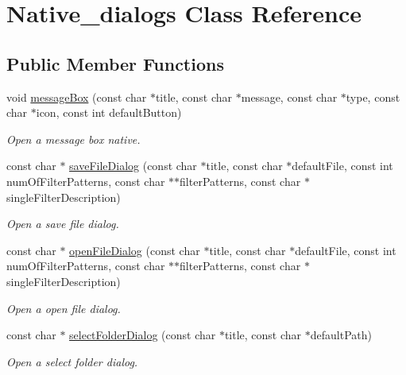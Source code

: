 \hypertarget{class_native__dialogs}{}\section{Native\+\_\+dialogs Class Reference}
\label{class_native__dialogs}
\subsection*{Public Member Functions}
\begin{DoxyCompactItemize}
\item 
void \hyperlink{class_native__dialogs_a325b62ac200ee9d8287a7320643d5385}{message\+Box} (const char $\ast$title, const char $\ast$message, const char $\ast$type, const char $\ast$icon, const int default\+Button)
\begin{DoxyCompactList}\small\item\em Open a message box native. \end{DoxyCompactList}\item 
const char $\ast$ \hyperlink{class_native__dialogs_a4bf815830a674dc34903d272391bcac3}{save\+File\+Dialog} (const char $\ast$title, const char $\ast$default\+File, const int num\+Of\+Filter\+Patterns, const char $\ast$$\ast$filter\+Patterns, const char $\ast$single\+Filter\+Description)
\begin{DoxyCompactList}\small\item\em Open a save file dialog. \end{DoxyCompactList}\item 
const char $\ast$ \hyperlink{class_native__dialogs_a57d8bdda43d74e367598bd5dc530b526}{open\+File\+Dialog} (const char $\ast$title, const char $\ast$default\+File, const int num\+Of\+Filter\+Patterns, const char $\ast$$\ast$filter\+Patterns, const char $\ast$single\+Filter\+Description)
\begin{DoxyCompactList}\small\item\em Open a open file dialog. \end{DoxyCompactList}\item 
const char $\ast$ \hyperlink{class_native__dialogs_a8bdf80cf55d1d5cf2835bc1b3e4084cc}{select\+Folder\+Dialog} (const char $\ast$title, const char $\ast$default\+Path)
\begin{DoxyCompactList}\small\item\em Open a select folder dialog. \end{DoxyCompactList}\end{DoxyCompactItemize}


